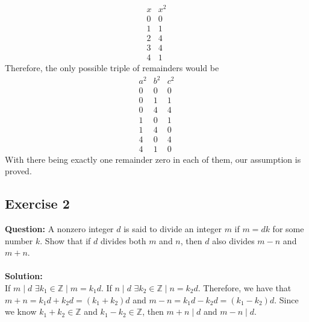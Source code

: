 \documentclass{article}
\begin{document}
\begin{displaymath}
\begin{array}{c|c}
x & x^2\\
\hline
0 & 0\\
1 & 1\\
2 & 4\\
3 & 4\\
4 & 1
\end{array}
\end{displaymath}
Therefore, the only possible triple of remainders would be
\begin{displaymath}
\begin{array}{c|c|c}
a^{2} & b^{2} & c^{2}\\
\hline
0 & 0 & 0\\
0 & 1 & 1\\
0 & 4 & 4\\
1 & 0 & 1\\
1 & 4 & 0\\
4 & 0 & 4\\
4 & 1 & 0
\end{array}
\end{displaymath}
With there being exactly one remainder zero in each of them, our assumption is proved.\\
\newpage
\subsection{Exercise 2}
\textbf{Question:} A nonzero integer $d$ is said to divide an integer $m$ if $m = dk$ for some number $k$. Show that if $d$ divides both $m$ and $n$, then $d$ also divides $m-n$ and $m+n$.\\
\\\textbf{Solution:}\\
If $m\mid d$ $\exists k_{1}\in \mathbb{Z}\mid m = k_{1}d$. If $n\mid d$ $\exists k_{2}\in \mathbb{Z}\mid n = k_{2}d$. Therefore, we have that $m + n = k_{1}d+k_{2}d = (k_{1}+k_{2})d$ and $m-n = k_{1}d-k_{2}d = (k_{1}-k_{2})d$. Since we know $k_{1}+k_{2}\in \mathbb{Z}$ and $k_{1}-k_{2}\in \mathbb{Z}$, then $m+n\mid d$ and $m-n\mid d$.
\newpage
\end{document}
